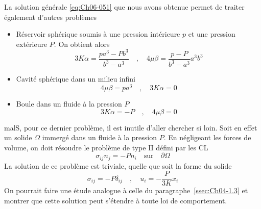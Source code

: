 La solution générale \eqref{eq:Ch06-051} que nous avons obtenue permet de traiter également d'autres problèmes
\begin{itemize}
    \item Réservoir sphérique soumis à une pression intérieure $p$ et une pression extérieure $P$.
        On obtient alors
        \begin{equation}
            3K\alpha = \frac{p a^3 - P b^3}{b^3 - a^3} \quad,\quad 4\mu\beta = \frac{p-P}{b^3-a^3}a^3 b^3
            \label{eq:Ch06-059}
        \end{equation}
    \item Cavité sphérique dans un milieu infini
        \begin{equation}
            4\mu\beta = p a^3 \quad , \quad 3 K \alpha = 0
            \label{eq:Ch06-060}
        \end{equation}
    \item Boule dans un fluide à la pression $P$
        \begin{equation}
            3K\alpha = -P \quad,\quad 4 \mu\beta = 0
            \label{eq:Ch06-061}
        \end{equation}
\end{itemize}
malS, pour ce dernier problème, il est inutile d'aller chercher si loin.
Soit en effet un solide $\Omega$ immergé dans un fluide à la pression $P$.
En négligeant les forces de volume, on doit résoudre le problème de type II défini par les CL
\begin{equation}
    \sigma_{ij} n_j = -P n_i \quad \text{sur} \quad \partial \Omega
    \label{eq:Ch06-062}
\end{equation}
La solution de ce problème est triviale, quelle que soit la forme du solide
\begin{equation}
    \sigma_{ij} = -P \delta_{ij} \quad , \quad u_i = -\frac{P}{3K} x_i
    \label{eq:Ch06-063}
\end{equation}
On pourrait faire une étude analogue à celle du paragraphe~\ref{ssec:Ch04-1.3} et montrer que cette solution peut s'étendre à toute loi de comportement.
